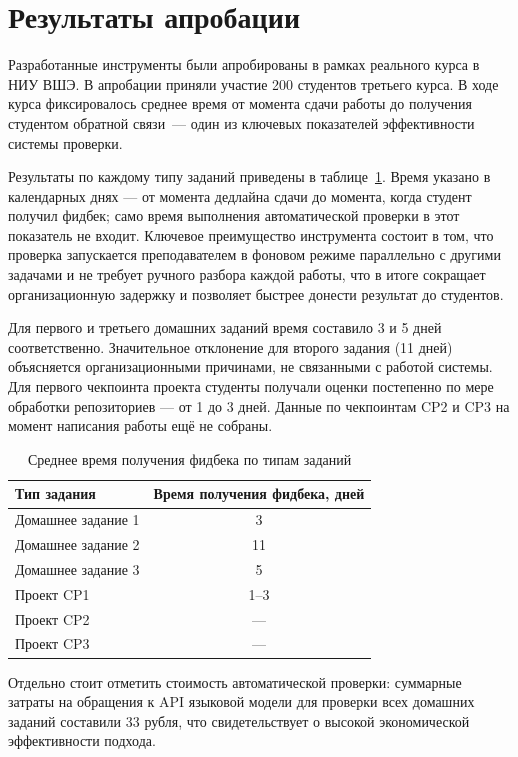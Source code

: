 \section{Результаты апробации}

Разработанные инструменты были апробированы в рамках реального курса в НИУ ВШЭ. В апробации приняли участие 200 студентов третьего курса. В ходе курса фиксировалось среднее время от момента сдачи работы до получения студентом обратной связи~--- один из ключевых показателей эффективности системы проверки.
 
Результаты по каждому типу заданий приведены в таблице~\ref{tab:time_results}. Время указано в календарных днях --- от момента дедлайна сдачи до момента, когда студент получил фидбек; само время выполнения автоматической проверки в этот показатель не входит. Ключевое преимущество инструмента состоит в том, что проверка запускается преподавателем в фоновом режиме параллельно с другими задачами и не требует ручного разбора каждой работы, что в итоге сокращает организационную задержку и позволяет быстрее донести результат до студентов.
 
Для первого и третьего домашних заданий время составило 3 и 5 дней соответственно. Значительное отклонение для второго задания (11 дней) объясняется организационными причинами, не связанными с работой системы. Для первого чекпоинта проекта студенты получали оценки постепенно по мере обработки репозиториев --- от 1 до 3 дней. Данные по чекпоинтам CP2 и CP3 на момент написания работы ещё не собраны.
 
\begin{table}[h!]
\caption{Среднее время получения фидбека по типам заданий}
\label{tab:time_results}
\centering
\small
\begin{tabular}{|l|c|}
\hline
\textbf{Тип задания} & \textbf{Время получения фидбека, дней} \\
\hline
Домашнее задание 1 & 3 \\
\hline
Домашнее задание 2 & 11 \\
\hline
Домашнее задание 3 & 5 \\
\hline
Проект CP1 & 1--3 \\
\hline
Проект CP2 & --- \\
\hline
Проект CP3 & --- \\
\hline
\end{tabular}
\end{table}

Отдельно стоит отметить стоимость автоматической проверки: суммарные затраты на обращения к API языковой модели для проверки всех домашних заданий составили 33 рубля, что свидетельствует о высокой экономической эффективности подхода.

